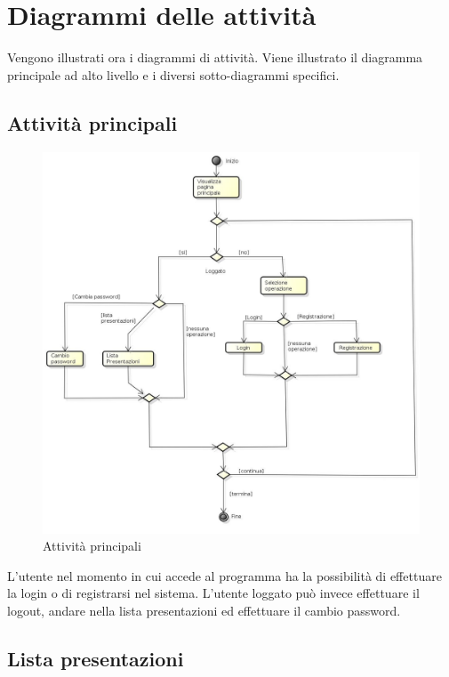 \newpage
\section{Diagrammi delle attività}
Vengono illustrati ora i diagrammi di attività. Viene illustrato il diagramma principale ad alto livello e i diversi sotto-diagrammi specifici.

\subsection{Attività principali}

\begin{figure}[h!]
		\centering
		\includegraphics[scale=.4]{img/Premi.jpg}
		\caption{Attività principali}
		\label{fig:Attivita_principali}
\end{figure}

L'utente nel momento in cui accede al programma ha la possibilità di effettuare la login o di registrarsi nel sistema. 
L'utente loggato può invece effettuare il logout, andare nella lista presentazioni ed effettuare il cambio password.

\subsection{Lista presentazioni}

